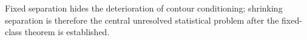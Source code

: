 Fixed separation hides the deterioration of contour conditioning; shrinking separation is therefore the central unresolved statistical problem after the fixed-class theorem is established.